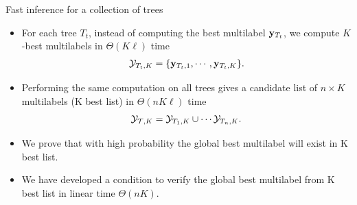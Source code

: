 \documentclass[first=dgreen,second=purple,logo=yellowexc]{aaltoslides}
\begin{document}
%
\begin{frame}[allowframebreaks]{Fast inference for a collection of trees}
	\begin{itemize}
		\item For each tree $T_t$, instead of computing the best multilabel $\mathbf {y}_{T_t}$, we compute $K$-best multilabels in $\Theta(K\ell)$ time
		\begin{align*}
			\mathcal{Y}_{T_t,K} = \{\mathbf {y}_{T_t,1},\cdots,\mathbf {y}_{T_t,K}\}.
		\end{align*}
		\item Performing the same computation on all trees gives a candidate list of $n\times K$ multilabels (K best list) in $\Theta(nK\ell)$ time
		\begin{align*}
			\mathcal{Y}_{\mathcal{T},K}=\mathcal{Y}_{T_1,K}\cup\cdots\mathcal{Y}_{T_n,K}.
		\end{align*}
		\item We prove that with high probability the global best multilabel will exist in K best list.
		\item We have developed a condition to verify the global best multilabel from K best list in linear time $\Theta(nK)$.
	\end{itemize}
\end{frame}
\end{document}
